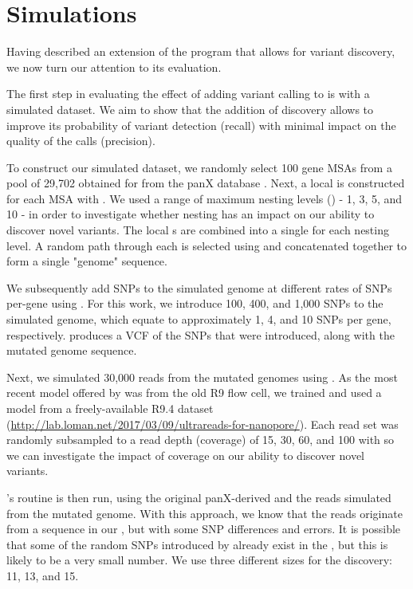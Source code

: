 \section{Simulations}
Having described an extension of the \pandora{} program that allows for \denovo{} variant discovery, we now turn our attention to its evaluation.

The first step in evaluating the effect of adding \denovo{} variant calling to \pandora{} is with a simulated dataset. We aim to show that the addition of \denovo{} discovery allows \pandora{} to improve its probability of variant detection (recall) with minimal impact on the quality of the calls (precision). 

To construct our simulated dataset, we randomly select 100 gene MSAs from a pool of 29,702 obtained for \ecoli{} from the panX database \cite{panx}. Next, a local \prg{} is constructed for each MSA with \makeprg{}. We used a range of maximum nesting levels () - 1, 3, 5, and 10 - in order to investigate whether \prg{} nesting has an impact on our ability to discover novel variants. The local \prg{}s are combined into a single \panrg{} for each nesting level. A random path through each \prg{} is selected using \pandora{} and concatenated together to form a single "genome" sequence. 

We subsequently add SNPs to the simulated genome at different rates of SNPs per-gene using  \cite{snpmutator}. For this work, we introduce 100, 400, and 1,000 SNPs to the simulated genome, which equate to approximately 1, 4, and 10 SNPs per gene, respectively.  produces a VCF of the SNPs that were introduced, along with the mutated genome sequence.

Next, we simulated 30,000 \ont{} reads from the mutated genomes using  \cite{yang2017,brinda2018}. As the most recent model offered by  was from the old R9 \ont{} flow cell, we trained and used a model from a freely-available \ecoli{} R9.4 dataset (\url{http://lab.loman.net/2017/03/09/ultrareads-for-nanopore/}). Each read set was randomly subsampled to a read depth (coverage) of 15, 30, 60, and 100 with  \cite{rasusa2019} so we can investigate the impact of coverage on our ability to discover novel variants.

\pandora{}'s  routine is then run, using the original panX-derived \panrg{} and the reads simulated from the mutated genome. With this approach, we know that the reads originate from a sequence in our \panrg{}, but with some SNP differences and \ont{} errors. It is possible that some of the random SNPs introduced by  already exist in the \panrg{}, but this is likely to be a very small number. We use three different \kmer{} sizes for the \denovo{} discovery: 11, 13, and 15. 


